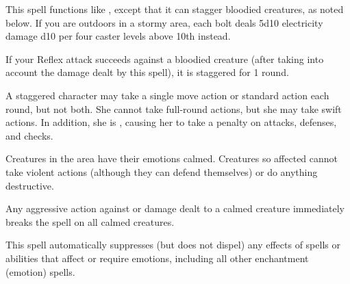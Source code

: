 \begin{spelleffect}
    This spell functions like , except that it can stagger bloodied creatures, as noted below. If you are outdoors in a stormy area, each bolt deals 5d10 electricity damage \add d10 per four caster levels above 10th instead.
\end{spelleffect}
\begin{spellblood}
    If your Reflex attack succeeds against a bloodied creature (after taking into account the damage dealt by this spell), it is staggered for 1 round.
\end{spellblood}
\begin{spellnotes}
 A staggered character may take a single move action or standard action each round, but not both. She cannot take full-round actions, but she may take swift actions. In addition, she is \vulnerable, causing her to take a  penalty on attacks, defenses, and checks.
\end{spellnotes}

\spellrng{\rngmed}
\begin{spelleffect}
  Creatures in the area have their emotions calmed. Creatures so affected cannot take violent actions (although they can defend themselves) or do anything destructive.
\end{spelleffect}
\begin{spellnotes}
  Any aggressive action against or damage dealt to a calmed creature immediately breaks the spell on all calmed creatures.

  This spell automatically suppresses (but does not dispel) any effects of spells or abilities that affect or require emotions, including all other enchantment (emotion) spells.
\end{spellnotes}

